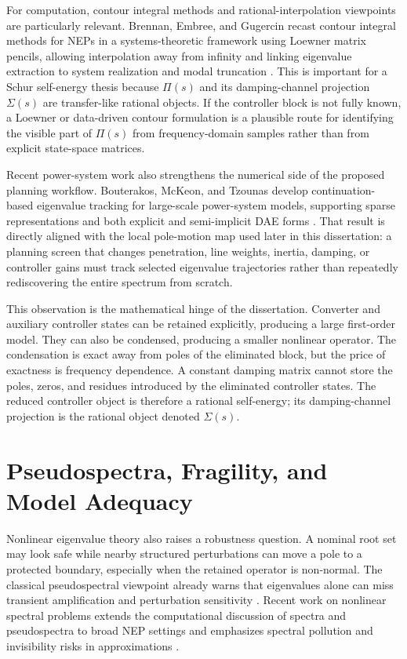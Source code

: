 For computation, contour integral methods and rational-interpolation
viewpoints are particularly relevant. Brennan, Embree, and Gugercin recast
contour integral methods for NEPs in a systems-theoretic framework using
Loewner matrix pencils, allowing interpolation away from infinity and linking
eigenvalue extraction to system realization and modal truncation
\cite{brennan2023contour}. This is important for a Schur self-energy thesis
because \(\Pi(s)\) and its damping-channel projection \(\Sigma(s)\) are
transfer-like rational objects. If the
controller block is not fully known, a Loewner or data-driven contour
formulation is a plausible route for identifying the visible part of
\(\Pi(s)\) from frequency-domain samples rather than from explicit
state-space matrices.

Recent power-system work also strengthens the numerical side of the proposed
planning workflow. Bouterakos, McKeon, and Tzounas develop continuation-based
eigenvalue tracking for large-scale power-system models, supporting sparse
representations and both explicit and semi-implicit DAE forms
\cite{bouterakos2025tracking}. That result is directly aligned with the local
pole-motion map used later in this dissertation: a planning screen that changes
penetration, line weights, inertia, damping, or controller gains must track
selected eigenvalue trajectories rather than repeatedly rediscovering the entire
spectrum from scratch.

This observation is the mathematical hinge of the dissertation. Converter and
auxiliary controller states can be retained explicitly, producing a large
first-order model. They can also be condensed, producing a smaller nonlinear
operator. The condensation is exact away from poles of the eliminated block,
but the price of exactness is frequency dependence. A constant damping matrix
cannot store the poles, zeros, and residues introduced by the eliminated
controller states. The reduced controller object is therefore a rational
self-energy; its damping-channel projection is the rational object denoted
\(\Sigma(s)\).

\section{Pseudospectra, Fragility, and Model Adequacy}

Nonlinear eigenvalue theory also raises a robustness question. A nominal root
set may look safe while nearby structured perturbations can move a pole to a
protected boundary, especially when the retained operator is non-normal. The
classical pseudospectral viewpoint already warns that eigenvalues alone can
miss transient amplification and perturbation sensitivity
\cite{trefethen2005spectra}. Recent work on nonlinear spectral problems
extends the computational discussion of spectra and pseudospectra to broad NEP
settings and emphasizes spectral pollution and invisibility risks in
approximations \cite{colbrook2025universal}.

